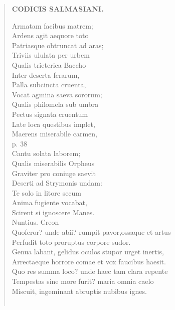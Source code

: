 \documentclass[11pt, a4paper]{report}
\begin{document}
\begin{verse}
    \begin{center} \textbf{CODICIS SALMASIANI.} \end{center}Armatam facibus matrem; \\ Ardens agit aequore toto \\ Patriasque obtruncat ad aras; \\ Triviis ululata per urbem \\ Qualis trieterica Baccho \\ Inter deserta ferarum, \\ Palla subcincta cruenta, \\ Vocat agmina saeva sororum; \\ Qualis philomela sub umbra \\ Pectus signata cruentum \\ Late loca questibus implet, \\ Maerens miserabile carmen, \\ p. 38 \\ Cantu solata laborem; \\  \lbrack Qualis miserabilis Orpheus \rbrack  \\ Graviter pro coniuge saevit \\ Deserti ad Strymonis undam: \\ Te solo in litore secum \\ Anima fugiente vocabat, \\ Scirent si ignoscere Manes. \\ Nuntius. Creon \\ Quoferor? unde abii?  \lbrack rumpit \rbrack  pavor,ossaque et artus \\ Perfudit toto proruptus corpore sudor. \\ Genua labant,  \lbrack gelidus \rbrack  oculos stupor urget inertis, \\ Arrectaeque horrore comae et vox faucibus haesit. \\ Quo res summa loco? unde haec tam clara repente \\ Tempestas sine more furit? maria omnia caelo \\ Miscuit, ingeminant abruptis nubibus ignes. \\ 
        ﻿\pagebreak 

\end{verse}
\end{document}

